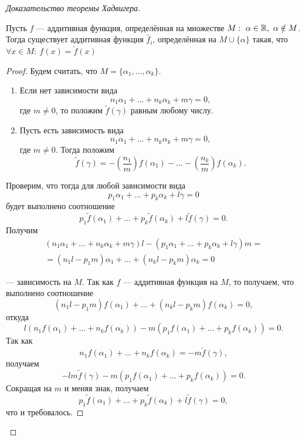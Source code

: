 \begin{proof}[Доказательство теоремы Хадвигера]

\begin{lemma}[1]
    Пусть $f$ — аддитивная функция, определённая на множестве $M: \ \alpha \in \mathbb{R}, \ \alpha \notin M$. Тогда существует аддитивная функция $\tilde{f_i}$, определённая на $M \cup \{\alpha\}$ такая, что $\forall x \in M: \ f(x) = \tilde{f}(x)$
\end{lemma}
\begin{proof}
    Будем считать, что $M = \{\alpha_1, \dots, \alpha_k\}$.
    \begin{enumerate}
        \item Если нет зависимости вида 
        \[n_1 \alpha_1 + \dots + n_k \alpha_k + m \gamma = 0,\]
        где $m \neq 0$, то положим $\tilde{f}(\gamma)$ равным любому числу.
        \item Пусть есть зависимость вида 
        \[n_1 \alpha_1 + \dots + n_k \alpha_k + m \gamma = 0,\]
        где $m \neq 0$. Тогда положим
        \[\tilde{f}(\gamma) = - \left(\frac{n_1}{m}\right) f(\alpha_1) - \dots - \left(\frac{n_k}{m}\right) f(\alpha_k).\]
    \end{enumerate}

    Проверим, что тогда для любой зависимости вида
    \[p_1 \alpha_1 + \dots + p_k \alpha_k + l \gamma = 0\]
    будет выполнено соотношение
    \[p_1 \tilde{f}(\alpha_1) + \dots + p_k \tilde{f}(\alpha_k) + l \tilde{f}(\gamma) = 0.\]
    Получим
    \begin{multline*}
        (n_1 \alpha_1 + \dots + n_k \alpha_k + m \gamma) l - (p_1 \alpha_1 + \dots + p_k \alpha_k + l \gamma) m = \\= (n_1 l - p_1 m) \alpha_1 + \dots + (n_k l - p_k m) \alpha_k = 0
    \end{multline*}

    — зависимость на $M$. Так как $f$ — аддитивная функция на $M$, то получаем, что выполнено соотношение 
    \[(n_1 l - p_1 m) f(\alpha_1) + \dots + (n_k l - p_k m) f(\alpha_k) = 0,\]
    откуда
    \[l(n_1 f(\alpha_1) + \dots + n_k f(\alpha_k)) - m (p_1 f(\alpha_1) + \dots + p_k f(\alpha_k)) = 0.\]
    Так как 
    \[n_1 f(\alpha_1) + \dots + n_k f(\alpha_k) = -m \tilde{f}(\gamma),\]
    получаем
    \[-lm \tilde{f}(\gamma) - m(p_1 f(\alpha_1) + \dots + p_k f(\alpha_k)) = 0.\]
    Сокращая на $m$ и меняя знак, получаем
    \[p_1 \tilde{f}(\alpha_1) + \dots + p_k \tilde{f}(\alpha_k) + l \tilde{f}(\gamma) = 0,\]
    что и требовалось.
    

\end{proof}
\end{proof}
